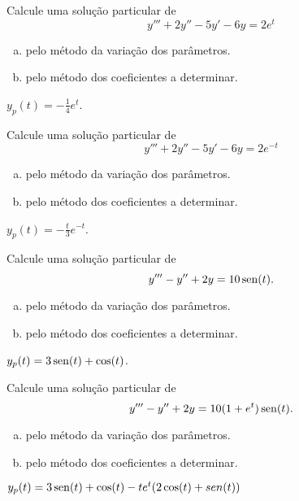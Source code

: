 \begin{ex}
  Calcule uma solução particular de
  \begin{equation}
    y''' + 2y'' - 5y' - 6y = 2e^t
  \end{equation}
  \begin{enumerate}[a)]
  \item pelo método da variação dos parâmetros.
  \item pelo método dos coeficientes a determinar.
  \end{enumerate}
\end{ex}
\begin{resp}
  $y_p(t) = -\frac{1}{4}e^{t}$.
\end{resp}

\begin{ex}
  Calcule uma solução particular de
  \begin{equation}
    y''' + 2y'' - 5y' - 6y = 2e^{-t}
  \end{equation}
  \begin{enumerate}[a)]
  \item pelo método da variação dos parâmetros.
  \item pelo método dos coeficientes a determinar.
  \end{enumerate}
\end{ex}
\begin{resp}
  $y_p(t) = -\frac{t}{3}e^{-t}$.
\end{resp}

\begin{ex}
  Calcule uma solução particular de
  \begin{equation}
    y''' - y'' + 2y = 10\operatorname{sen}(t).
  \end{equation}
  \begin{enumerate}[a)]
  \item pelo método da variação dos parâmetros.
  \item pelo método dos coeficientes a determinar.
  \end{enumerate}
\end{ex}
\begin{resp}
  $y_p(t) = 3\operatorname{sen}(t) + \cos(t)$.
\end{resp}

\begin{ex}
  Calcule uma solução particular de
  \begin{equation}
    y''' - y'' + 2y = 10(1 + e^t)\operatorname{sen}(t).
  \end{equation}
  \begin{enumerate}[a)]
  \item pelo método da variação dos parâmetros.
  \item pelo método dos coeficientes a determinar.
  \end{enumerate}
\end{ex}
\begin{resp}
  $y_p(t) = 3\operatorname{sen}(t) + \cos(t) - te^{t}(2\cos(t) + sen(t))$
\end{resp}
